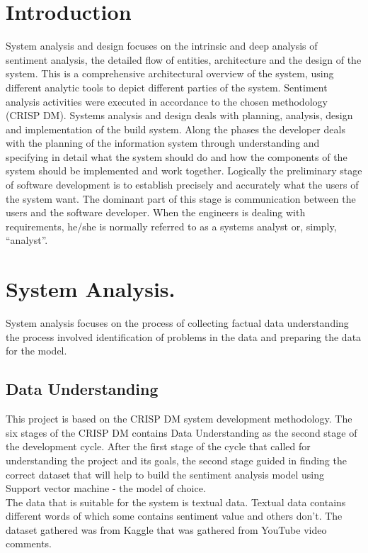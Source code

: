\documentclass[12pt]{report}
\begin{document}
	\section{Introduction}
	System analysis and design focuses on the intrinsic and deep analysis of sentiment analysis, the detailed flow of entities, architecture and the design of the system. This is a comprehensive architectural overview of the system, using different analytic tools to depict different parties of the system. Sentiment analysis activities were executed in accordance to the chosen methodology (CRISP DM). Systems analysis and design deals with planning, analysis, design and implementation of the build system. Along the phases the developer deals with the planning of the information system through understanding and specifying in detail what the system should do and how the components of the system should be implemented and work together. Logically the preliminary stage of software development is to establish precisely and accurately what the users of the system want. The dominant part of this stage is communication between the users and the software developer. When the engineers is dealing with requirements, he/she is normally referred to as a systems analyst or, simply, “analyst”.\\
	
	\section{System Analysis.}
	System analysis focuses on the process of collecting factual data understanding the process involved identification of problems in the data and preparing the data for the model.\\
	
		\subsection{Data Understanding}
	This project is based on the CRISP DM system development methodology. The six stages of the CRISP DM contains Data Understanding as the second stage of the development cycle. After the first stage of the cycle that called for understanding the project and its goals, the second stage guided in finding the correct dataset that will help to build the sentiment analysis model using Support vector machine - the model of choice.\\
	
	The data that is suitable for the system is textual data. Textual data contains different words of which some contains sentiment value and others don’t. The dataset gathered was from Kaggle that was gathered from YouTube video comments.\\
	
\end{document}
